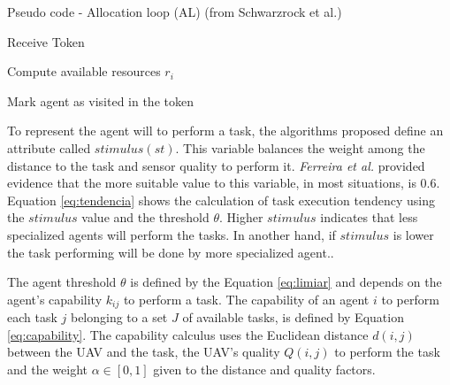 \begin{algorithm}[h!t]
	\caption{Pseudo code - Allocation loop (AL) (from Schwarzrock et al.\cite{MAS07})}
	\label{algo:swarm-gap}
	
	\SetAlgoLined
	\DontPrintSemicolon
	\SetNlSkip{0.3em}
	
	Receive Token\; \label{line:recebe}
	
	Compute available resources $r_i $ \; \label{line:compute_r}
	
	Mark agent as visited in the token\; \label{line:ALini}
\end{algorithm}

To represent the agent will to perform a task, the algorithms proposed define an attribute called $stimulus (st)$. This variable balances the weight among the distance to the task and sensor quality to perform it. \textit{Ferreira et al.}\cite{ferreira2007swarm} provided evidence that the more suitable value to this variable, in most situations, is $0.6$. Equation \ref{eq:tendencia} shows the calculation of task execution tendency using the $stimulus$ value and the threshold $\theta$. Higher $stimulus$ indicates that less specialized agents will perform the tasks. In another hand, if $stimulus$ is lower the task performing will be done by more specialized agent.\cite{bonabeau1999swarm}. 

The agent threshold $\theta$ is defined by the Equation \ref{eq:limiar} and depends on the agent's capability $k_{ij}$ to perform a task. The capability of an agent $i$ to perform each task $j$ belonging to a set $J$ of available tasks, is defined by Equation \ref{eq:capability}. The capability calculus uses the Euclidean distance $d(i,j)$ between the UAV and the task, the UAV's quality $Q(i,j)$ to perform the task and the weight $\alpha \in [0,1]$ given to the distance and quality factors. 

